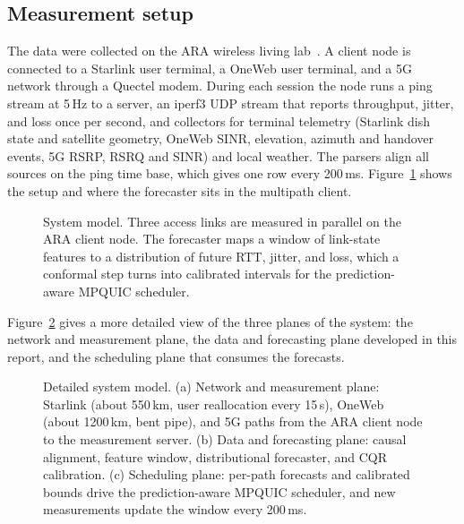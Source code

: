 \subsection{Measurement setup}
The data were collected on the ARA wireless living lab~\cite{islam2025design}. A client node is connected to a Starlink user terminal, a OneWeb user terminal, and a 5G network through a Quectel modem. During each session the node runs a ping stream at 5\,Hz to a server, an iperf3 UDP stream that reports throughput, jitter, and loss once per second, and collectors for terminal telemetry (Starlink dish state and satellite geometry, OneWeb SINR, elevation, azimuth and handover events, 5G RSRP, RSRQ and SINR) and local weather. The parsers align all sources on the ping time base, which gives one row every 200\,ms. Figure~\ref{fig:system} shows the setup and where the forecaster sits in the multipath client.

\begin{figure}[t]
  \centering
  \resizebox{0.82\linewidth}{!}{}
  \caption{System model. Three access links are measured in parallel on the ARA client node. The forecaster maps a window of link-state features to a distribution of future RTT, jitter, and loss, which a conformal step turns into calibrated intervals for the prediction-aware MPQUIC scheduler.}
  \label{fig:system}
\end{figure}

Figure~\ref{fig:sysdetail} gives a more detailed view of the three planes of the system: the network and measurement plane, the data and forecasting plane developed in this report, and the scheduling plane that consumes the forecasts.

\begin{figure}[p]
  \centering
  \caption{Detailed system model. (a) Network and measurement plane: Starlink (about 550\,km, user reallocation every 15\,s), OneWeb (about 1200\,km, bent pipe), and 5G paths from the ARA client node to the measurement server. (b) Data and forecasting plane: causal alignment, feature window, distributional forecaster, and CQR calibration. (c) Scheduling plane: per-path forecasts and calibrated bounds drive the prediction-aware MPQUIC scheduler, and new measurements update the window every 200\,ms.}
  \label{fig:sysdetail}
\end{figure}

